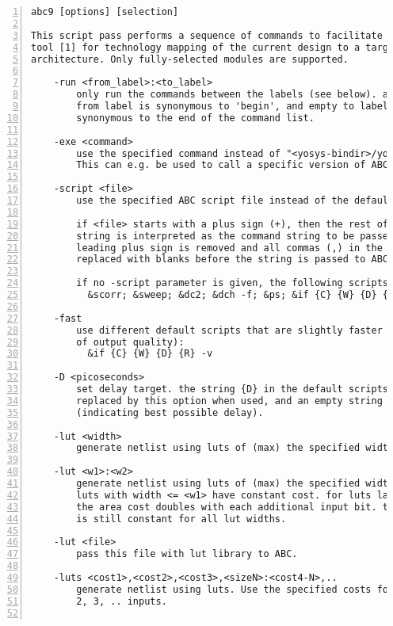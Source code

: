 \begin{lstlisting}[numbers=left,frame=single]
    abc9 [options] [selection]

This script pass performs a sequence of commands to facilitate the use of the ABC
tool [1] for technology mapping of the current design to a target FPGA
architecture. Only fully-selected modules are supported.

    -run <from_label>:<to_label>
        only run the commands between the labels (see below). an empty
        from label is synonymous to 'begin', and empty to label is
        synonymous to the end of the command list.

    -exe <command>
        use the specified command instead of "<yosys-bindir>/yosys-abc" to execute ABC.
        This can e.g. be used to call a specific version of ABC or a wrapper.

    -script <file>
        use the specified ABC script file instead of the default script.

        if <file> starts with a plus sign (+), then the rest of the filename
        string is interpreted as the command string to be passed to ABC. The
        leading plus sign is removed and all commas (,) in the string are
        replaced with blanks before the string is passed to ABC.

        if no -script parameter is given, the following scripts are used:
          &scorr; &sweep; &dc2; &dch -f; &ps; &if {C} {W} {D} {R} -v; &mfs

    -fast
        use different default scripts that are slightly faster (at the cost
        of output quality):
          &if {C} {W} {D} {R} -v

    -D <picoseconds>
        set delay target. the string {D} in the default scripts above is
        replaced by this option when used, and an empty string otherwise
        (indicating best possible delay).

    -lut <width>
        generate netlist using luts of (max) the specified width.

    -lut <w1>:<w2>
        generate netlist using luts of (max) the specified width <w2>. All
        luts with width <= <w1> have constant cost. for luts larger than <w1>
        the area cost doubles with each additional input bit. the delay cost
        is still constant for all lut widths.

    -lut <file>
        pass this file with lut library to ABC.

    -luts <cost1>,<cost2>,<cost3>,<sizeN>:<cost4-N>,..
        generate netlist using luts. Use the specified costs for luts with 1,
        2, 3, .. inputs.


\end{lstlisting}
